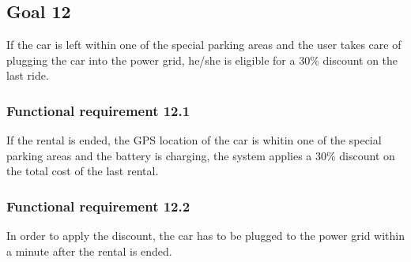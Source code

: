 \subsection{Goal 12}
If the car is left within one of the special parking areas and the user takes care of plugging the car into the power grid, he/she is eligible for a 30\% discount on the last ride.

\setcounter{secnumdepth}{3}
\subsubsection{Functional requirement 12.1}
If the rental is ended, the GPS location of the car is whitin one of the special parking areas and the battery is charging, the system applies a 30\% discount on the total cost of the last rental.

\subsubsection{Functional requirement 12.2}
In order to apply the discount, the car has to be plugged to the power grid within a minute after the rental is ended.
